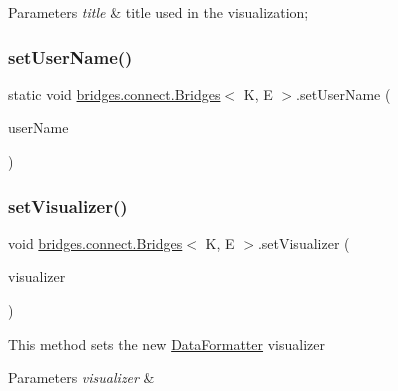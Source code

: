 \begin{DoxyParams}{Parameters}
{\em title} & title used in the visualization; \\
\hline
\end{DoxyParams}
\hypertarget{classbridges_1_1connect_1_1_bridges_a2d84103645662308e58a1b473d3320ae}{}\label{classbridges_1_1connect_1_1_bridges_a2d84103645662308e58a1b473d3320ae} 
\subsubsection{\texorpdfstring{set\+User\+Name()}{setUserName()}}
{\footnotesize\ttfamily static void \hyperlink{classbridges_1_1connect_1_1_bridges}{bridges.\+connect.\+Bridges}$<$ K, E $>$.set\+User\+Name (\begin{DoxyParamCaption}\item[{String}]{user\+Name }\end{DoxyParamCaption})\hspace{0.3cm}{\ttfamily [static]}}

\hypertarget{classbridges_1_1connect_1_1_bridges_ad627f604914734646e92fac9e7b385d8}{}\label{classbridges_1_1connect_1_1_bridges_ad627f604914734646e92fac9e7b385d8} 
\subsubsection{\texorpdfstring{set\+Visualizer()}{setVisualizer()}}
{\footnotesize\ttfamily void \hyperlink{classbridges_1_1connect_1_1_bridges}{bridges.\+connect.\+Bridges}$<$ K, E $>$.set\+Visualizer (\begin{DoxyParamCaption}\item[{\hyperlink{classbridges_1_1base_1_1_a_d_t_visualizer}{A\+D\+T\+Visualizer}$<$ K, E $>$}]{visualizer }\end{DoxyParamCaption})}

This method sets the new \hyperlink{classbridges_1_1connect_1_1_data_formatter}{Data\+Formatter} visualizer 
\begin{DoxyParams}{Parameters}
{\em visualizer} & \\
\hline
\end{DoxyParams}
\hypertarget{classbridges_1_1connect_1_1_bridges_a6881ed6e3f3a1db1d3cda249eb8543a1}{}\label{classbridges_1_1connect_1_1_bridges_a6881ed6e3f3a1db1d3cda249eb8543a1} 
